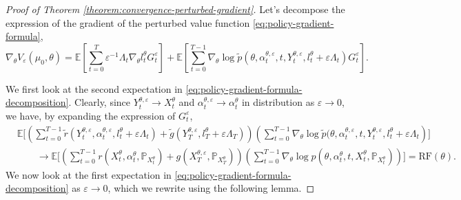 \documentclass[11pt]{article}
\numberwithin{equation}{section}
\theoremstyle{definition}
\theoremstyle{remark}
\def\eps{\varepsilon}
\begin{document}
\begin{proof}[Proof of Theorem \ref{theorem:convergence-perturbed-gradient}]
Let's decompose the expression of the gradient of the perturbed value function \eqref{eq:policy-gradient-formula},
\begin{equation}
    \label{eq:policy-gradient-formula-decomposition}
    \nabla_{\theta} V_\eps(\mu_0, \theta) = \mathbb E \left[ \sum_{t = 0}^{T} \eps^{-1} \Lambda_t \nabla_{\theta} l_t^\theta G_t^\eps \right] + \mathbb E \left[ \sum_{t=0}^{T-1} \nabla_\theta \log \tilde p(\theta, \alpha_t^{\theta,\eps}, t,Y_t^{\theta,\eps}, l_t^\theta + \eps \Lambda_t) G_t^\eps \right].
\end{equation}

We first look at the second expectation in \eqref{eq:policy-gradient-formula-decomposition}. 
Clearly, since $Y_t^{\theta,\eps} \to X_t^\theta$ and $\alpha_t^{\theta, \eps} \to \alpha_t^\theta$ in distribution as $\eps \to 0$, we have, by expanding the expression of $G_t^\eps$, 
\[
\begin{aligned}
 &\mathbb E \Bigg[\left( \sum_{t = 0}^{T - 1} \tilde r(Y^{\theta,\eps}_t, \alpha_t^{\theta,\eps}, l_t^\theta + \eps \Lambda_t) + \tilde g(Y_T^{\theta, \eps},  l_T^\theta + \eps \Lambda_T) \right) \left( \sum_{t = 0}^{T - 1} \nabla_\theta \log \tilde p(\theta, \alpha_t^{\theta,\eps}, t,Y_t^{\theta,\eps}, l_t^\theta + \eps \Lambda_t \right)  \Bigg] \\
 &\qquad \to \mathbb E \Bigg[\left( \sum_{t = 0}^{T - 1} r(X^{\theta}_t, \alpha_t^{\theta}, \mathbb P_{X_t^\theta}) + g(X_T^{\theta, \eps},  \mathbb P_{X^{\theta}_T} ) \right) \left( \sum_{t = 0}^{T - 1} \nabla_\theta \log p(\theta, \alpha_t^{\theta}, t,X_t^{\theta}, \mathbb P_{X^{\theta}_t}) \right)  \Bigg] = \mathrm{RF}(\theta).
\end{aligned}
\]
We now look at the first expectation in \eqref{eq:policy-gradient-formula-decomposition} as $\eps \to 0$, which we rewrite using the following lemma.


\end{proof}
\end{document}
